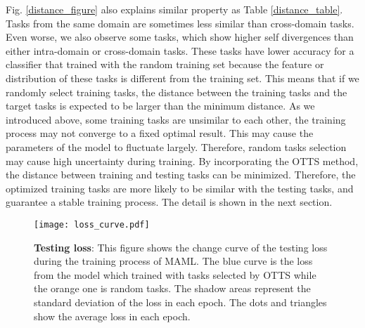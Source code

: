 \documentclass[10pt,journal,compsoc]{IEEEtran}
\begin{document}
Fig. \ref{distance_figure} also explains similar property as Table \ref{distance_table}. Tasks from the same domain are sometimes less similar than cross-domain tasks. Even worse, we also observe some tasks, which show higher self divergences than either intra-domain or cross-domain tasks. These tasks have lower accuracy for a classifier that trained with the random training set because the feature or distribution of these tasks is different from the training set. This means that if we randomly select training tasks, the distance between the training tasks and the target tasks is expected to be larger than the minimum distance. As we introduced above, some training tasks are unsimilar to each other, the training process may not converge to a fixed optimal result. This may cause the parameters of the model to fluctuate largely. Therefore, random tasks selection may cause high uncertainty during training. By incorporating the OTTS method, the distance between training and testing tasks can be minimized. Therefore, the optimized training tasks are more likely to be similar with the testing tasks, and guarantee a stable training process. The detail is shown in the next section.

\begin{figure}[!t]
\centering
\texttt{[image: loss\_curve.pdf]}
\caption{\textbf{Testing loss}: This figure shows the change curve of the testing loss during the training process of MAML. The blue curve is the loss from the model which trained with tasks selected by OTTS while the orange one is random tasks. The shadow areas represent the standard deviation of the loss in each epoch. The dots and triangles show the average loss in each epoch.}
\label{loss_curve_figure}
\end{figure}
\end{document}
